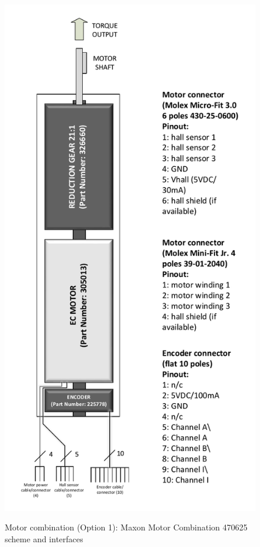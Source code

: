 \begin{figure}
  \centering
  \includegraphics[angle=90,width=1\columnwidth]{figs/body02/FIGDEVICECOMBINATIONOPTION1DRAWING.pdf}\\
  \caption[Motor combination (Option 1): Maxon Motor Combination 470625 scheme and interfaces]{Motor combination (Option 1): Maxon Motor Combination 470625 scheme and interfaces}
  \label{FIG:DEVICECOMBINATIONOPTION1DRAWING}
\end{figure}
